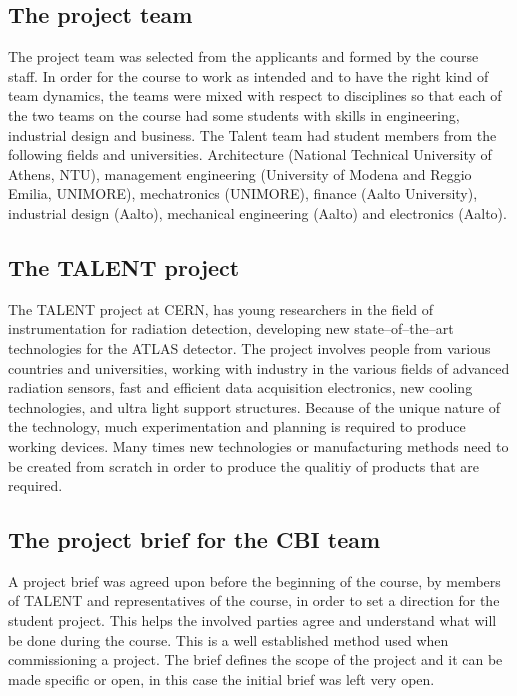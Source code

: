 \documentclass[english,12pt,a4paper,pdftex]{article}
\begin{document}
\subsection{The project team}

The project team was selected from the applicants and formed by the course staff. In order for the course to work as intended and to have the right kind of team dynamics, the teams were mixed with respect to disciplines so that each of the two teams on the course had some students with skills in engineering, industrial design and business. The Talent team had student members from the following fields and universities. Architecture (National Technical University of Athens, NTU), management engineering (University of Modena and Reggio Emilia, UNIMORE), mechatronics (UNIMORE), finance (Aalto University), industrial design (Aalto), mechanical engineering (Aalto) and electronics (Aalto).


\subsection{The TALENT project}

The TALENT project at CERN, has young researchers in the field of instrumentation for radiation detection, developing new state--of--the--art technologies for the ATLAS detector. The project involves people from various countries and universities, working with industry in the various fields of advanced radiation sensors, fast and efficient data acquisition electronics, new cooling technologies, and ultra light support structures. Because of the unique nature of the technology, much experimentation and planning is required to produce working devices. Many times new technologies or manufacturing methods need to be created from scratch in order to produce the qualitiy of products that are required.


\subsection{The project brief for the CBI team}

A project brief was agreed upon before the beginning of the course, by members of TALENT and representatives of the course, in order to set a direction for the student project. This helps the involved parties agree and understand what will be done during the course. This is a well established method used when commissioning a project. The brief defines the scope of the project and it can be made specific or open, in this case the initial brief was left very open.
\end{document}
